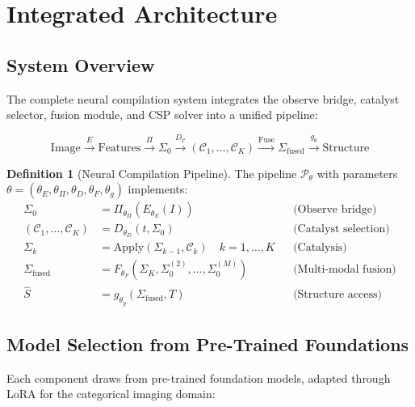 \documentclass[11pt,twocolumn,a4paper]{article}
\theoremstyle{definition}
\newtheorem{definition}[theorem]{Definition}
\theoremstyle{remark}
\newcommand{\Sig}{\Sigma}
\newcommand{\catalyst}{\mathcal{C}}
\newcommand{\params}{\theta}
\begin{document}
\section{Integrated Architecture}
\label{sec:architecture}

\subsection{System Overview}

The complete neural compilation system integrates the observe bridge, catalyst selector, fusion module, and CSP solver into a unified pipeline:

\begin{equation}
\text{Image} \xrightarrow{E} \text{Features} \xrightarrow{\Pi} \Sig_0 \xrightarrow{D_\catalyst} (\catalyst_1, \ldots, \catalyst_K) \xrightarrow{\text{Fuse}} \Sig_{\text{fused}} \xrightarrow{g_\params} \text{Structure}
\end{equation}

\begin{definition}[Neural Compilation Pipeline]
\label{def:pipeline}
The pipeline $\mathcal{P}_\params$ with parameters $\params = (\params_E, \params_\Pi, \params_D, \params_F, \params_g)$ implements:
\begin{align}
\Sig_0 &= \Pi_{\params_\Pi}(E_{\params_E}(I)) && \text{(Observe bridge)} \\
(\catalyst_1, \ldots, \catalyst_K) &= D_{\params_D}(t, \Sig_0) && \text{(Catalyst selection)} \\
\Sig_k &= \text{Apply}(\Sig_{k-1}, \catalyst_k) \quad k = 1, \ldots, K && \text{(Catalysis)} \\
\Sig_{\text{fused}} &= F_{\params_F}(\Sig_K, \Sig_0^{(2)}, \ldots, \Sig_0^{(M)}) && \text{(Multi-modal fusion)} \\
\hat{S} &= g_{\params_g}(\Sig_{\text{fused}}, T) && \text{(Structure access)}
\end{align}
\end{definition}

\subsection{Model Selection from Pre-Trained Foundations}

Each component draws from pre-trained foundation models, adapted through LoRA for the categorical imaging domain:
\end{document}
